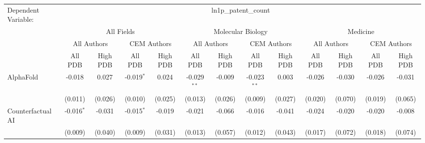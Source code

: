 \begingroup
\centering
\begin{tabular}{lcccccccccccc}
   \tabularnewline \midrule \midrule
   Dependent Variable: & \multicolumn{12}{c}{ln1p\_patent\_count}\\
 & \multicolumn{4}{c}{All Fields} & \multicolumn{4}{c}{Molecular Biology} & \multicolumn{4}{c}{Medicine} \\
\cmidrule(lr){2-5} \cmidrule(lr){6-9} \cmidrule(lr){10-13}
 & \multicolumn{2}{c}{All Authors} & \multicolumn{2}{c}{CEM Authors} & \multicolumn{2}{c}{All Authors} & \multicolumn{2}{c}{CEM Authors} & \multicolumn{2}{c}{All Authors} & \multicolumn{2}{c}{CEM Authors} \\
\cmidrule(lr){2-3} \cmidrule(lr){4-5} \cmidrule(lr){6-7} \cmidrule(lr){8-9} \cmidrule(lr){10-11} \cmidrule(lr){12-13}
 & \multicolumn{1}{c}{All PDB} & \multicolumn{1}{c}{High PDB} & \multicolumn{1}{c}{All PDB} & \multicolumn{1}{c}{High PDB} & \multicolumn{1}{c}{All PDB} & \multicolumn{1}{c}{High PDB} & \multicolumn{1}{c}{All PDB} & \multicolumn{1}{c}{High PDB} & \multicolumn{1}{c}{All PDB} & \multicolumn{1}{c}{High PDB} & \multicolumn{1}{c}{All PDB} & \multicolumn{1}{c}{High PDB} \\
\cmidrule(lr){2-2} \cmidrule(lr){3-3} \cmidrule(lr){4-4} \cmidrule(lr){5-5} \cmidrule(lr){6-6} \cmidrule(lr){7-7} \cmidrule(lr){8-8} \cmidrule(lr){9-9} \cmidrule(lr){10-10} \cmidrule(lr){11-11} \cmidrule(lr){12-12} \cmidrule(lr){13-13}
   AlphaFold                                                  & -0.018         & 0.027          & -0.019$^{*}$   & 0.024          & -0.029$^{**}$  & -0.009         & -0.023$^{**}$  & 0.003          & -0.026         & -0.030         & -0.026         & -0.031\\   
                                                              & (0.011)        & (0.026)        & (0.010)        & (0.025)        & (0.013)        & (0.026)        & (0.009)        & (0.027)        & (0.020)        & (0.070)        & (0.019)        & (0.065)\\   
   Counterfactual AI                                          & -0.016$^{*}$   & -0.031         & -0.015$^{*}$   & -0.019         & -0.021         & -0.066         & -0.016         & -0.041         & -0.024         & -0.020         & -0.020         & -0.008\\   
                                                              & (0.009)        & (0.040)        & (0.009)        & (0.031)        & (0.013)        & (0.057)        & (0.012)        & (0.043)        & (0.017)        & (0.072)        & (0.018)        & (0.074)\\   

\end{tabular}

